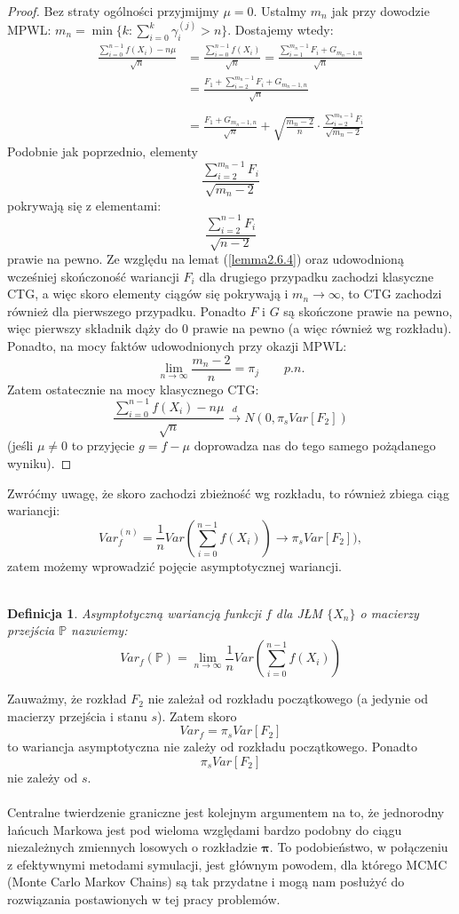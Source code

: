 \documentclass[a4paper]{article}
\theoremstyle{defn}
\newtheorem{defn}{Definicja}[subsection]
\theoremstyle{theorem}
\theoremstyle{lemma}
\theoremstyle{cor}
\theoremstyle{fact}
\begin{document}
\begin{proof}
Bez straty ogólności przyjmijmy $\mu = 0$. Ustalmy $m_n$ jak przy dowodzie MPWL:
$m_n = \min \{k: \sum\limits_{i=0}^k \gamma_i^{(j)} > n\}$. Dostajemy wtedy:
\begin{align*}
    \frac{\sum\limits_{i=0}^{n-1} f(X_i) - n\mu}{\sqrt{n}} &= \frac{\sum\limits_{i=0}^{n-1} f(X_i)}{\sqrt{n}} = \frac{\sum\limits_{i=1}^{m_n-1} F_i + G_{m_n-1, n}}{\sqrt{n}}\\
    &= \frac{F_1 + \sum\limits_{i=2}^{m_n-1} F_i + G_{m_n-1, n}}{\sqrt{n}}\\\\
    &= \frac{F_1 + G_{m_n-1, n}}{\sqrt{n}} + \sqrt{\frac{m_n -2}{n}} \cdot \frac{\sum\limits_{i=2}^{m_n-1} F_i }{\sqrt{m_n-2}}
\end{align*}
Podobnie jak poprzednio, elementy $$\frac{\sum\limits_{i=2}^{m_n-1} F_i }{\sqrt{m_n-2}}$$
pokrywają się z elementami:
$$\frac{\sum\limits_{i=2}^{n-1} F_i }{\sqrt{n-2}}$$
prawie na pewno. Ze względu na lemat (\ref{lemma2.6.4}) oraz udowodnioną wcześniej skończoność wariancji $F_i$ dla drugiego przypadku zachodzi klasyczne CTG, a więc skoro elementy ciągów się pokrywają i $m_n \to \infty$, to CTG zachodzi również dla pierwszego przypadku. Ponadto $F$ i $G$ są skończone prawie na pewno, więc pierwszy składnik dąży do 0 prawie na pewno (a więc również wg rozkładu). Ponadto, na mocy faktów udowodnionych przy okazji MPWL:
$$ \lim\limits_{n \to \infty} \frac{m_n -2}{n} = \pi_j \quad\quad p.n.$$
Zatem ostatecznie na mocy klasycznego CTG:
$$\frac{\sum\limits_{i=0}^{n-1} f(X_i) - n\mu}{\sqrt{n}} \overset{d}{\to} N(0, \pi_s Var[F_2])$$
(jeśli $\mu \neq 0$ to przyjęcie $g = f - \mu$ doprowadza nas do tego samego pożądanego wyniku).
\end{proof}
Zwróćmy uwagę, że skoro zachodzi zbieżność wg rozkładu, to również zbiega ciąg wariancji:
$$Var_f^{(n)} = \frac{1}{n} Var\left(\sum\limits_{i=0}^{n-1} f(X_i)\right) \to \pi_s Var[F_2]),$$
zatem możemy wprowadzić pojęcie asymptotycznej wariancji.\\\\
\begin{defn}\label{defn2.6.6}
Asymptotyczną wariancją funkcji $f$ dla JŁM $\{X_n\}$ o macierzy przejścia $\mathbb{P}$ nazwiemy:
$$Var_{f}(\mathbb{P}) = \lim\limits_{n \to \infty} \frac{1}{n} Var\left(\sum\limits_{i=0}^{n-1} f(X_i)\right)$$
\end{defn}
Zauważmy, że rozkład $F_2$ nie zależał od rozkładu początkowego (a jedynie od macierzy przejścia i stanu $s$). Zatem skoro $$Var_f = \pi_s Var[F_2]$$
to wariancja asymptotyczna nie zależy od rozkładu początkowego. Ponadto
$$\pi_s Var[F_2]$$
nie zależy od $s$.\\\\
Centralne twierdzenie graniczne jest kolejnym argumentem na to, że jednorodny łańcuch Markowa jest pod wieloma względami bardzo podobny do ciągu niezależnych zmiennych losowych o rozkładzie $\boldsymbol{\pi}$. To podobieństwo, w połączeniu z efektywnymi metodami symulacji, jest głównym powodem, dla którego MCMC (Monte Carlo Markov Chains) są tak przydatne i mogą nam posłużyć do rozwiązania postawionych w tej pracy problemów.\\
\end{document}
